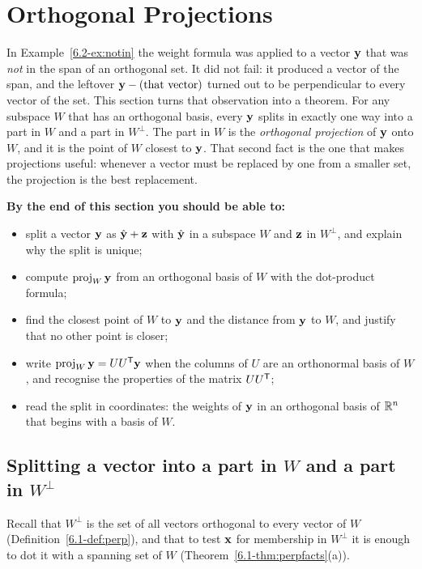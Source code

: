\documentclass[11pt]{article}
\begin{document}
\section{Orthogonal Projections}

\begin{guide}
In Example~\ref{6.2-ex:notin} the weight formula was applied to a vector $\mathbf{y}$ that was \emph{not} in the span of an orthogonal set. It did not fail: it produced a vector of the span, and the leftover $\mathbf{y}-(\text{that vector})$ turned out to be perpendicular to every vector of the set. This section turns that observation into a theorem. For any subspace $W$ that has an orthogonal basis, every $\mathbf{y}$ splits in exactly one way into a part in $W$ and a part in $W^{\perp}$. The part in $W$ is the \emph{orthogonal projection} of $\mathbf{y}$ onto $W$, and it is the point of $W$ closest to $\mathbf{y}$. That second fact is the one that makes projections useful: whenever a vector must be replaced by one from a smaller set, the projection is the best replacement.
\end{guide}

\textbf{By the end of this section you should be able to:}
\begin{itemize}
  \item split a vector $\mathbf{y}$ as $\hat{\mathbf{y}}+\mathbf{z}$ with $\hat{\mathbf{y}}$ in a subspace $W$ and $\mathbf{z}$ in $W^{\perp}$, and explain why the split is unique;
  \item compute $\operatorname{proj}_W\mathbf{y}$ from an orthogonal basis of $W$ with the dot-product formula;
  \item find the closest point of $W$ to $\mathbf{y}$ and the distance from $\mathbf{y}$ to $W$, and justify that no other point is closer;
  \item write $\operatorname{proj}_W\mathbf{y}=UU^{\mathsf T}\mathbf{y}$ when the columns of $U$ are an orthonormal basis of $W$, and recognise the properties of the matrix $UU^{\mathsf T}$;
  \item read the split in coordinates: the weights of $\mathbf{y}$ in an orthogonal basis of $\mathbb{R}^n$ that begins with a basis of $W$.
\end{itemize}

\subsection*{Splitting a vector into a part in $W$ and a part in $W^{\perp}$}

Recall that $W^{\perp}$ is the set of all vectors orthogonal to every vector of $W$ (Definition~\ref{6.1-def:perp}), and that to test $\mathbf{x}$ for membership in $W^{\perp}$ it is enough to dot it with a spanning set of $W$ (Theorem~\ref{6.1-thm:perpfacts}(a)).
\end{document}
